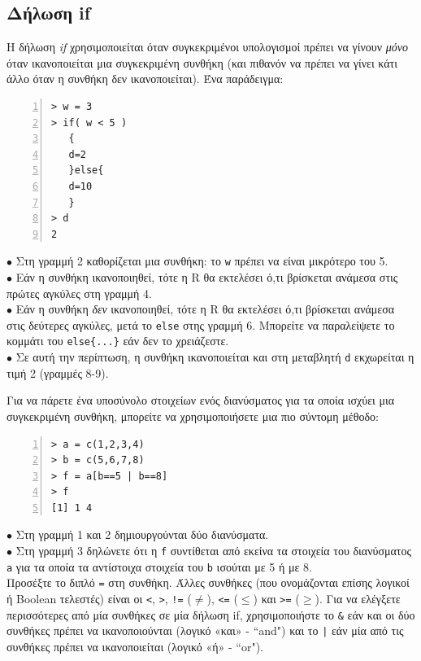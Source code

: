 \documentclass[a4paper,10pt,twocolumn]{article}
\begin{document}
\subsection{Δήλωση if}

Η δήλωση \emph{if} χρησιμοποιείται όταν συγκεκριμένοι υπολογισμοί πρέπει να γίνουν \emph{μόνο} όταν
ικανοποιείται μια συγκεκριμένη συνθήκη (και πιθανόν να πρέπει να γίνει κάτι άλλο όταν η συνθήκη δεν
ικανοποιείται). Ένα παράδειγμα:

\begin{Verbatim}[frame=single,numbers=left,gobble=0, xleftmargin=0.35cm, numbersep=0.1cm]
> w = 3
> if( w < 5 )
   {
   d=2
   }else{
   d=10
   }
> d
2
\end{Verbatim}

\noindent $\bullet$ Στη γραμμή 2 καθορίζεται μια συνθήκη: το \texttt{w} πρέπει να είναι μικρότερο του 5.\\
\noindent $\bullet$ Εάν η συνθήκη ικανοποιηθεί, τότε η R θα εκτελέσει ό,τι βρίσκεται ανάμεσα στις πρώτες αγκύλες
στη γραμμή 4.\\
\noindent $\bullet$ Εάν η συνθήκη \emph{δεν} ικανοποιηθεί, τότε η R θα εκτελέσει ό,τι βρίσκεται ανάμεσα στις
δεύτερες αγκύλες, μετά το \texttt{else} στης γραμμή 6. Μπορείτε να παραλείψετε το κομμάτι του \verb!else{...}!
εάν δεν το χρειάζεστε.\\
\noindent $\bullet$ Σε αυτή την περίπτωση, η συνθήκη ικανοποιείται και στη μεταβλητή \texttt{d} εκχωρείται
η τιμή 2 (γραμμές 8-9).

Για να πάρετε ένα υποσύνολο στοιχείων ενός διανύσματος για τα οποία ισχύει μια συγκεκριμένη συνθήκη, μπορείτε 
να χρησιμοποιήσετε μια πιο σύντομη μέθοδο:

\begin{Verbatim}[frame=single,numbers=left,gobble=0, xleftmargin=0.35cm, numbersep=0.1cm]
> a = c(1,2,3,4)
> b = c(5,6,7,8)
> f = a[b==5 | b==8]
> f
[1] 1 4
\end{Verbatim}

\noindent $\bullet$ Στη γραμμή 1 και 2 δημιουργούνται δύο διανύσματα.\\
\noindent $\bullet$ Στη γραμμή 3 δηλώνετε ότι η \texttt{f} συντίθεται από εκείνα τα στοιχεία του διανύσματος
\texttt{a} για τα οποία τα αντίστοιχα στοιχεία του \texttt{b} ισούται με 5 ή με 8. \\

Προσέξτε το διπλό \texttt{=} στη συνθήκη. Άλλες συνθήκες (που ονομάζονται επίσης λογικοί ή Boolean τελεστές)
είναι οι \texttt{<}, \texttt{>}, \texttt{!=} ($\neq$), \texttt{<=} ($\leq$) και \texttt{>=} ($\geq$). Για να
ελέγξετε περισσότερες από μία συνθήκες σε μία δήλωση if, χρησιμοποιήστε το \texttt{\&} εάν και οι δύο 
συνθήκες πρέπει να ικανοποιούνται (λογικό «και» - ``and") και το \texttt{|} εάν μία από τις συνθήκες πρέπει να 
ικανοποιείται (λογικό «ή» - ``or").
\end{document}

